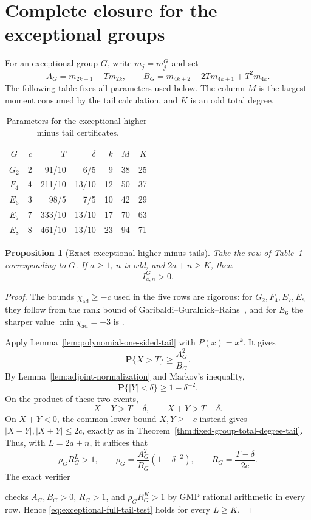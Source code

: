 \documentclass[11pt,reqno]{amsart}
\theoremstyle{plain}
\newtheorem{proposition}[theorem]{Proposition}
\theoremstyle{definition}
\newcommand{\chiad}{\chi_{\mathrm{ad}}}
\begin{document}
\section{Complete closure for the exceptional groups}

For an exceptional group $G$, write $m_j=m_j^G$ and set
\[
 A_G=m_{2k+1}-T m_{2k},\qquad
 B_G=m_{4k+2}-2T m_{4k+1}+T^2m_{4k}.
\]
The following table fixes all parameters used below.  The column $M$ is the
largest moment consumed by the tail calculation, and $K$ is an odd total
degree.
\begin{table}[ht]
\centering
\begin{tabular}{c|rrrrrr}
$G$&$c$&$T$&$\delta$&$k$&$M$&$K$\\ \hline
$G_2$&2&91/10&6/5&9&38&25\\
$F_4$&4&211/10&13/10&12&50&37\\
$E_6$&3&98/5&7/5&10&42&29\\
$E_7$&7&333/10&13/10&17&70&63\\
$E_8$&8&461/10&13/10&23&94&71
\end{tabular}
\caption{Parameters for the exceptional higher-minus tail certificates.}
\label{tab:exceptional-full-tail}
\end{table}

\begin{proposition}[Exact exceptional higher-minus tails]
\label{prop:exceptional-full-tail}
Take the row of Table~\ref{tab:exceptional-full-tail} corresponding to $G$.
If $a\geq1$, $n$ is odd, and $2a+n\geq K$, then
\[
 I^G_{a,n}>0.
\]
\end{proposition}

\begin{proof}
The bounds $\chiad\geq-c$ used in the five rows are rigorous: for
$G_2,F_4,E_7,E_8$ they follow from the rank bound of
Garibaldi--Guralnick--Rains~\cite[Theorem~2.1]{GaribaldiGuralnickRains2025},
and for $E_6$ the sharper value $\min\chiad=-3$ is
\cite[Theorem~2.3 and Table~1]{GaribaldiGuralnickRains2025}.

Apply Lemma~\ref{lem:polynomial-one-sided-tail} with $P(x)=x^k$.  It gives
\[
 \mathbf P\{X>T\}\geq \frac{A_G^2}{B_G}.
\]
By Lemma~\ref{lem:adjoint-normalization} and Markov's inequality,
\[
 \mathbf P\{|Y|<\delta\}\geq1-\delta^{-2}.
\]
On the product of these two events,
\[
 X-Y>T-\delta,
 \qquad
 X+Y>T-\delta.
\]
On $X+Y<0$, the common lower bound $X,Y\geq-c$ instead gives
$|X-Y|,|X+Y|\leq2c$, exactly as in
Theorem~\ref{thm:fixed-group-total-degree-tail}.  Thus, with $L=2a+n$, it
suffices that
\begin{equation}
\label{eq:exceptional-full-tail-test}
 \rho_G R_G^L>1,
 \qquad
 \rho_G=\frac{A_G^2}{B_G}(1-\delta^{-2}),
 \qquad
 R_G=\frac{T-\delta}{2c}.
\end{equation}
The exact verifier
\begin{center}
\end{center}
checks $A_G,B_G>0$, $R_G>1$, and
$\rho_GR_G^K>1$ by GMP rational arithmetic in every row.  Hence
\eqref{eq:exceptional-full-tail-test} holds for every $L\geq K$.
\end{proof}
\end{document}
